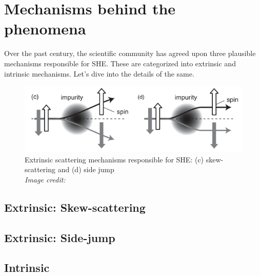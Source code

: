\section{Mechanisms behind the phenomena}

\label{sec:mechanisms}

Over the past century, the scientific community has agreed upon three plausible mechanisms responsible for SHE. These are categorized into extrinsic and intrinsic mechanisms. Let's dive into the details of the same.

\begin{figure}[h!]
    \centering
    \includegraphics[scale=0.7]{she-mechanisms.png}
    \caption{Extrinsic scattering mechanisms responsible for SHE: (c) skew-scattering and (d) side jump\\ \vspace{0.2cm} \textit{Image credit: \cite{murakami2015spin}}}
\end{figure}


\subsection{Extrinsic: Skew-scattering}

\subsection{Extrinsic: Side-jump}

\subsection{Intrinsic}
